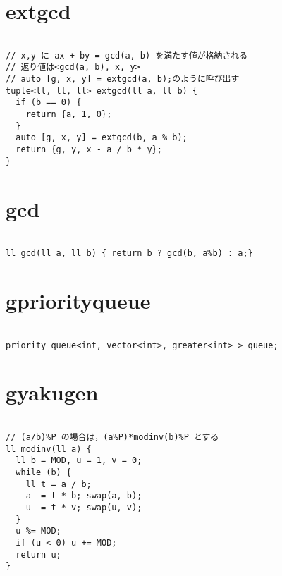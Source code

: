 \documentclass[a4j,titlepage]{jarticle} %
\begin{document}
\color{white}
\section{extgcd}
\color{black}
\begin{lstlisting}[caption=extgcd]

// x,y に ax + by = gcd(a, b) を満たす値が格納される
// 返り値は<gcd(a, b), x, y>
// auto [g, x, y] = extgcd(a, b);のように呼び出す
tuple<ll, ll, ll> extgcd(ll a, ll b) {
  if (b == 0) {
    return {a, 1, 0};
  }
  auto [g, x, y] = extgcd(b, a % b);
  return {g, y, x - a / b * y};
}

\end{lstlisting}

\color{white}
\section{gcd}
\color{black}
\begin{lstlisting}[caption=gcd]

ll gcd(ll a, ll b) { return b ? gcd(b, a%b) : a;}

\end{lstlisting}

\color{white}
\section{gpriorityqueue}
\color{black}
\begin{lstlisting}[caption=gpriorityqueue]

priority_queue<int, vector<int>, greater<int> > queue;

\end{lstlisting}

\color{white}
\section{gyakugen}
\color{black}
\begin{lstlisting}[caption=gyakugen]

// (a/b)%P の場合は，(a%P)*modinv(b)%P とする
ll modinv(ll a) {
  ll b = MOD, u = 1, v = 0;
  while (b) {
    ll t = a / b;
    a -= t * b; swap(a, b);
    u -= t * v; swap(u, v);
  }
  u %= MOD;
  if (u < 0) u += MOD;
  return u;
}

\end{lstlisting}

\color{white}
\end{document}
